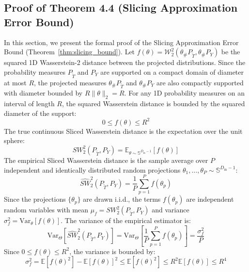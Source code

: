 \documentclass{article}
\theoremstyle{plain}
\theoremstyle{definition}
\theoremstyle{remark}
\begin{document}
\subsection{Proof of Theorem 4.4 (Slicing Approximation Error Bound)}
\label{sec:appendix_slicing_proof}
In this section, we present the formal proof of the Slicing Approximation Error Bound (Theorem~\ref{thm:slicing_bound}).
Let $f(\theta) = \mathcal{W}_2^2(\theta_{\# } P_{\tilde{T}}, \theta_{\# } P_Y)$ be the squared 1D Wasserstein-2 distance between the projected distributions. Since the probability measures $P_{\tilde{T}}$ and $P_Y$ are supported on a compact domain of diameter at most $R$, the projected measures $\theta_{\# } P_{\tilde{T}}$ and $\theta_{\# } P_Y$ are also compactly supported with diameter bounded by $R\|\theta\|_2 = R$. For any 1D probability measures on an interval of length $R$, the squared Wasserstein distance is bounded by the squared diameter of the support:
\begin{equation}
0 \le f(\theta) \le R^2
\end{equation}
The true continuous Sliced Wasserstein distance is the expectation over the unit sphere:
\begin{equation}
SW_2^2(P_{\tilde{T}}, P_Y) = \mathbb{E}_{\theta \sim \mathbb{S}^{D_{\text{in}}-1}}[f(\theta)]
\end{equation}
The empirical Sliced Wasserstein distance is the sample average over $P$ independent and identically distributed random projections $\theta_1, \dots, \theta_P \sim \mathbb{S}^{D_{\text{in}}-1}$:
\begin{equation}
\widehat{SW}_2^2(P_{\tilde{T}}, P_Y) = \frac{1}{P} \sum_{p=1}^P f(\theta_p)
\end{equation}
Since the projections $\{\theta_p\}$ are drawn i.i.d., the terms $f(\theta_p)$ are independent random variables with mean $\mu_f = SW_2^2(P_{\tilde{T}}, P_Y)$ and variance $\sigma_f^2 = \text{Var}_{\theta}[f(\theta)]$.
The variance of the empirical estimator is:
\begin{equation}
\text{Var}_{\Theta}\left[ \widehat{SW}_2^2(P_{\tilde{T}}, P_Y) \right] = \text{Var}_{\Theta}\left[ \frac{1}{P} \sum_{p=1}^P f(\theta_p) \right] = \frac{\sigma_f^2}{P}
\end{equation}
Since $0 \le f(\theta) \le R^2$, the variance is bounded by:
\begin{equation}
\sigma_f^2 = \mathbb{E}[f(\theta)^2] - \mathbb{E}[f(\theta)]^2 \le \mathbb{E}[f(\theta)^2] \le R^2 \mathbb{E}[f(\theta)] \le R^4
\end{equation}
\end{document}
